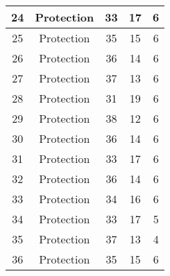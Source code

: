 \documentclass[results.tex]{subfiles}
\begin{document}
\begin{center}
\begin{tabular}{| c || c | c | c | c |}
            \hline
            24                      & Protection                   & 33                     & 17                      & 6                    \\
            \hline
            25                      & Protection                   & 35                     & 15                      & 6                    \\
            \hline
            26                      & Protection                   & 36                     & 14                      & 6                    \\
            \hline
            27                      & Protection                   & 37                     & 13                      & 6                    \\
            \hline
            28                      & Protection                   & 31                     & 19                      & 6                    \\
            \hline
            29                      & Protection                   & 38                     & 12                      & 6                    \\
            \hline
            30                      & Protection                   & 36                     & 14                      & 6                    \\
            \hline
            31                      & Protection                   & 33                     & 17                      & 6                    \\
            \hline
            32                      & Protection                   & 36                     & 14                      & 6                    \\
            \hline
            33                      & Protection                   & 34                     & 16                      & 6                    \\
            \hline
            34                      & Protection                   & 33                     & 17                      & 5                    \\
            \hline
            35                      & Protection                   & 37                     & 13                      & 4                    \\
            \hline
            36                      & Protection                   & 35                     & 15                      & 6                    \\

\end{tabular}
\end{center}
\end{document}
